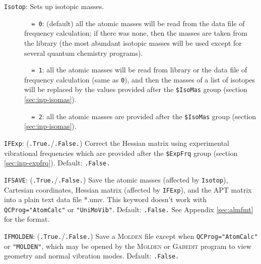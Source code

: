 \documentclass[12pt,english]{extarticle}
\begin{document}
\bigskip{}\bigskip{}
\verb|Isotop|: Sets up isotopic masses.
\begin{description}
\item[ ]\verb|  = 0|: (default) all the atomic masses will be read from the data file of frequency calculation;
if there was none, then the masses are taken from the library (the most abundant isotopic masses will be used except for several quantum chemistry programs).
\item[ ]\verb|  = 1|: all the atomic masses will be read from library or the data file of
frequency calculation (same as \verb|0|), and then the masses of a list of isotopes will be
replaced by the values provided after the \verb|$IsoMas| group (section \ref{sec:inp-isomas}).
\item[ ]\verb|  = 2|: all the atomic masses are provided after the \verb|$IsoMas| group (section \ref{sec:inp-isomas}).
\end{description}

\bigskip{}\bigskip{}
\verb|IFExp|: (\verb|.True.|/\verb|.False.|) Correct the Hessian matrix using
experimental vibrational frequencies which are provided after the \verb|$ExpFrq| group (section \ref{sec:inp-expfrq}).
Default: \verb|.False.|

\bigskip{}\bigskip{}
\verb|IFSAVE|: (\verb|.True.|/\verb|.False.|) Save the atomic masses (affected by
\verb|Isotop|), Cartesian coordinates, Hessian matrix (affected by
\verb|IFExp|), and the APT matrix into a plain text data file *.umv. This keyword
doesn't work with \verb|QCProg="AtomCalc"| or \verb|"UniMoVib"|. Default: \verb|.False.| See Appendix \ref{sec:almfmt} for the format.

\bigskip{}\bigskip{}
\verb|IFMOLDEN|: (\verb|.True.|/\verb|.False.|) Save a \textsc{Molden} file except when \verb|QCProg="AtomCalc"| or \verb|"MOLDEN"|, which may be opened by the \textsc{Molden} or \textsc{Gabedit} program to view geometry and normal vibration modes. Default: \verb|.False.|
\end{document}
